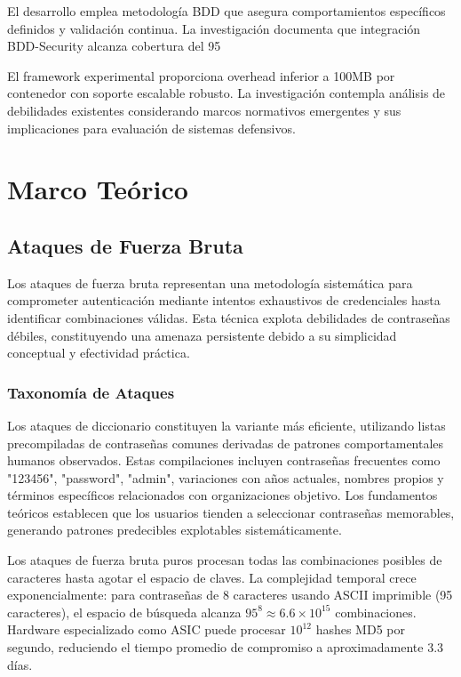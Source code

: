 El desarrollo emplea metodología BDD que asegura comportamientos específicos definidos y validación continua. La investigación \cite{Davis2024BDDSecurity} documenta que integración BDD-Security alcanza cobertura del 95%

El framework experimental \cite{Singh2024Labtainers} proporciona overhead inferior a 100MB por contenedor con soporte escalable robusto. La investigación contempla análisis de debilidades existentes considerando marcos normativos emergentes \cite{NIST2024AIFramework, Wilson2024EUAIAct} y sus implicaciones para evaluación de sistemas defensivos.

\section{Marco Teórico}

\subsection{Ataques de Fuerza Bruta}

Los ataques de fuerza bruta representan una metodología sistemática para comprometer autenticación mediante intentos exhaustivos de credenciales hasta identificar combinaciones válidas. Esta técnica explota debilidades de contraseñas débiles, constituyendo una amenaza persistente debido a su simplicidad conceptual y efectividad práctica.

\subsubsection{Taxonomía de Ataques}

Los ataques de diccionario constituyen la variante más eficiente, utilizando listas precompiladas de contraseñas comunes derivadas de patrones comportamentales humanos observados. Estas compilaciones incluyen contraseñas frecuentes como "123456", "password", "admin", variaciones con años actuales, nombres propios y términos específicos relacionados con organizaciones objetivo. Los fundamentos teóricos \cite{Morris1979Password} establecen que los usuarios tienden a seleccionar contraseñas memorables, generando patrones predecibles explotables sistemáticamente.

Los ataques de fuerza bruta puros procesan todas las combinaciones posibles de caracteres hasta agotar el espacio de claves. La complejidad temporal crece exponencialmente: para contraseñas de 8 caracteres usando ASCII imprimible (95 caracteres), el espacio de búsqueda alcanza \(95^8 \approx 6.6 \times 10^{15}\) combinaciones. Hardware especializado como ASIC puede procesar \(10^{12}\) hashes MD5 por segundo, reduciendo el tiempo promedio de compromiso a aproximadamente 3.3 días.

